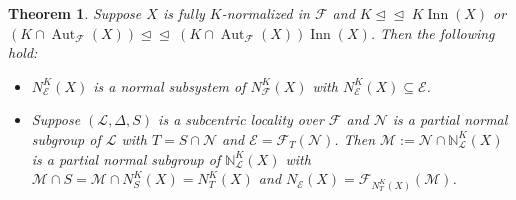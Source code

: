 \documentclass[reqno,11pt]{amsart}
\numberwithin{equation}{section}
\newtheorem{theorem}[equation]{Theorem}
\theoremstyle{definition}
\newcommand{\bN}{\mathbb{N}}
\newcommand{\F}{\mathcal{F}}
\newcommand{\E}{\mathcal{E}}
\renewcommand{\L}{\mathcal{L}}
\newcommand{\M}{\mathcal{M}}
\newcommand{\N}{\mathcal{N}}
\newcommand{\Aut}{\operatorname{Aut}}
\newcommand{\Inn}{\operatorname{Inn}}
\newcommand{\subn}{\unlhd\!\unlhd\;}
\begin{document}
\begin{theorem}\label{T:NEKX}
Suppose $X$ is fully $K$-normalized in $\F$ and $K\subn K\Inn(X)$ or $(K\cap \Aut_\F(X))\subn (K\cap \Aut_\F(X))\Inn(X)$. Then the following hold:
\begin{itemize}
\item [(a)] $N_\E^K(X)$ is a normal subsystem of $N_\F^K(X)$ with $N_\E^K(X)\subseteq \E$. 
\item [(b)] Suppose $(\L,\Delta,S)$ is a subcentric locality over $\F$ and $\N$ is a partial normal subgroup of $\L$ with $T=S\cap \N$ and $\E=\F_T(\N)$. Then $\M:=\N\cap \bN_\L^K(X)$ is a partial normal subgroup of $\bN_\L^K(X)$ with $\M\cap S=\M\cap N_S^K(X)=N_T^K(X)$ and $N_\E(X)=\F_{N_T^K(X)}(\M)$.
\end{itemize}
\end{theorem}
\end{document}
